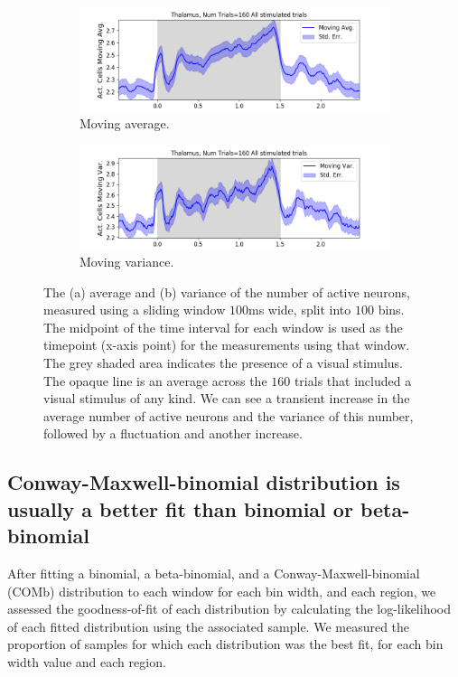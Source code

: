 \documentclass[a4paper,12pt]{article}
\theoremstyle{definition}
\begin{document}
    \begin{figure}[h]
      \begin{subfigure}[h]{\linewidth}
        \includegraphics[width=\linewidth]{figures/thalamus_1ms_moving_avg_all_stimulated_trials.png}
        \caption{Moving average.}
        \label{fig:thalamus_moving_avg_num_active_cells}
      \end{subfigure}
      \begin{subfigure}[h]{\linewidth}
        \includegraphics[width=\linewidth]{figures/thalamus_1ms_moving_var_all_stimulated_trials.png}
        \caption{Moving variance.}
        \label{fig:thalamus_moving_var_num_active_cells}
      \end{subfigure}
      \caption{The (a) average and (b) variance of the number of active neurons, measured using a sliding window $100$ms wide, split into $100$ bins. The midpoint of the time interval for each window is used as the timepoint (x-axis point) for the measurements using that window. The grey shaded area indicates the presence of a visual stimulus. The opaque line is an average across the $160$ trials that included a visual stimulus of any kind. We can see a transient increase in the average number of active neurons and the variance of this number, followed by a fluctuation and another increase.}
      \label{fig:thalamus_moving_avg_and_var}
    \end{figure}

    \newpage

  \subsection{Conway-Maxwell-binomial distribution is usually a better fit than binomial or beta-binomial}
  After fitting a binomial, a beta-binomial, and a Conway-Maxwell-binomial (COMb) distribution to each window for each bin width, and each region, we assessed the goodness-of-fit of each distribution by calculating the log-likelihood of each fitted distribution using the associated sample. We measured the proportion of samples for which each distribution was the best fit, for each bin width value and each region.
\end{document}
